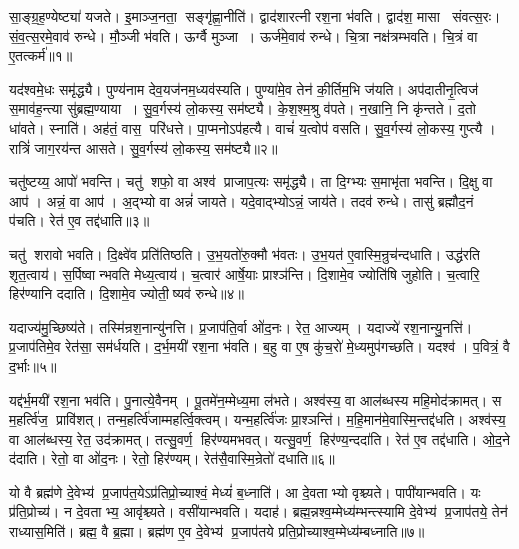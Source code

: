 
\clearpage
{}
\setcounter{anuvakam}{0}
सा॒ङ्ग्र॒ह॒ण्येष्ट्या॑ यजते। इ॒माञ्ज॒नता॒ सङ्गृ॑ह्णा॒नीति॑। द्वाद॑शारत्नी रश॒ना भ॑वति। द्वाद॑श॒ मासा संवत्स॒रः। सं॒व॒त्स॒रमे॒वाव॑ रुन्धे। मौ॒ञ्जी भ॑वति। ऊर्ग्वै मुञ्जा। ऊर्ज॑मे॒वाव॑ रुन्धे। चि॒त्रा नक्ष॑त्रम्भवति। चि॒त्रं वा ए॒तत्कर्म॑॥१॥

यद॑श्वमे॒धः समृ॑द्ध्यै। पुण्य॑नाम देव॒यज॑नम॒ध्यव॑स्यति। पुण्या॑मे॒व तेन॑ की॒र्तिम॒भि ज॑यति। अप॑दातीनृ॒त्विज॑ स॒माव॑ह॒न्त्या सु॑ब्रह्म॒ण्याया। सु॒व॒र्गस्य॑ लो॒कस्य॒ सम॑ष्ट्यै। के॒श॒श्म॒श्रु व॑पते। न॒खानि॒ नि कृ॑न्तते। द॒तो धा॑वते। स्नाति॑। अह॑तं॒ वास॒ परि॑धत्ते। पा॒प्मनोऽप॑हत्यै। वाचं॑ य॒त्वोप॑ वसति। सु॒व॒र्गस्य॑ लो॒कस्य॒ गुप्त्यै। रात्रिं॑ जाग॒रय॑न्त आसते। सु॒व॒र्गस्य॑ लो॒कस्य॒ सम॑ष्ट्यै॥२॥\anuvakamend[कर्म॑ धत्ते॒ पञ्च॑ च]

चतु॑ष्टय्य॒ आपो॑ भवन्ति। चतु॑ शफो॒ वा अश्व॑ प्राजाप॒त्यः समृ॑द्ध्यै। ता दि॒ग्भ्यः स॒माभृ॑ता भवन्ति। दि॒क्षु वा आप॑। अन्नं॒ वा आप॑। अ॒द्भ्यो वा अन्नं॑ जायते। यदे॒वाद्भ्योऽन्नं॒ जाय॑ते। तदव॑ रुन्धे। तासु॑ ब्रह्मौद॒नं प॑चति। रेत॑ ए॒व तद्द॑धाति॥३॥

चतु॑ शरावो भवति। दि॒क्ष्वे॑व प्रति॑तिष्ठति। उ॒भ॒यतो॑रु॒क्मौ भ॑वतः। उ॒भ॒यत॑ ए॒वास्मि॒न्रुच॑न्दधाति। उद्ध॑रति शृत॒त्वाय॑। स॒र्पिष्वान्भवति मेध्य॒त्वाय॑। च॒त्वार॑ आर्\mbox{}षे॒याः प्राश्ञ॑न्ति। दि॒शामे॒व ज्योति॑षि जुहोति। च॒त्वारि॒ हिर॑ण्यानि ददाति। दि॒शामे॒व ज्योती॒ष्यव॑ रुन्धे॥४॥

यदाज्य॑मु॒च्छिष्य॑ते। तस्मि॑न्रश॒नान्यु॑नत्ति। प्र॒जाप॑ति॒र्वा ओ॑द॒नः। रेत॒ आज्यम्। यदाज्ये॑ रश॒नान्यु॒नत्ति॑। प्र॒जाप॑तिमे॒व रेत॑सा॒ सम॑र्धयति। द॒र्भ॒मयी॑ रश॒ना भ॑वति। ब॒हु वा ए॒ष कु॑च॒रो॑ मे॒ध्यमुप॑गच्छति। यदश्व॑। प॒वित्रं॒ वै द॒र्भाः॥५॥

यद्द॑र्भ॒मयी॑ रश॒ना भव॑ति। पु॒नात्ये॒वैनम्। पू॒तमे॑न॒म्मेध्य॒मा ल॑भते। अश्व॑स्य॒ वा आल॑ब्धस्य महि॒मोद॑क्रामत्। स म॒हर्त्वि॑ज॒ प्रावि॑शत्। तन्म॒हर्त्वि॑जाम्महर्त्वि॒क्त्वम्। यन्म॒हर्त्वि॑जः प्रा॒श्ञन्ति॑। म॒हि॒मान॑मे॒वास्मि॒न्तद्द॑धति। अश्व॑स्य॒ वा आल॑ब्धस्य॒ रेत॒ उद॑क्रामत्। तत्सु॒वर्ण॒ हिर॑ण्यमभवत्। यत्सु॒वर्ण॒ हिर॑ण्य॒न्ददा॑ति। रेत॑ ए॒व तद्द॑धाति। ओ॒द॒ने द॑दाति। रेतो॒ वा ओ॑द॒नः। रेतो॒ हिर॑ण्यम्। रेत॑सै॒वास्मि॒न्रेतो॑ दधाति॥६॥\anuvakamend[द॒धा॒ति॒ रु॒न्धे॒ द॒र्भा अ॑भव॒थ्षट् च॑]

यो वै ब्रह्म॑णे दे॒वेभ्य॑ प्र॒जाप॑त॒येऽप्र॑तिप्रो॒च्याश्वं॒ मेध्यं॑ ब॒ध्नाति॑। आ दे॒वताभ्यो वृश्च्यते। पापी॑यान्भवति। यः प्र॑ति॒प्रोच्य॑। न दे॒वताभ्य॒ आवृ॑श्च्यते। वसी॑यान्भवति। यदाह॑। ब्रह्म॒न्नश्व॒म्मेध्य॑म्भन्त्स्यामि दे॒वेभ्य॑ प्र॒जाप॑तये॒ तेन॑ राध्यास॒मिति॑। ब्रह्म॒ वै ब्र॒ह्मा। ब्रह्म॑ण ए॒व दे॒वेभ्य॑ प्र॒जाप॑तये प्रति॒प्रोच्याश्व॒म्मेध्य॑म्बध्नाति॥७॥

